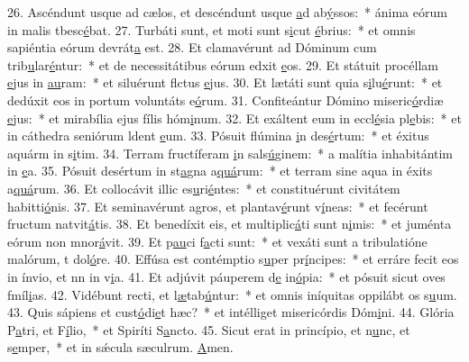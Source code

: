 26. Ascéndunt usque ad cælos, et descéndunt usque \uline{a}d ab\uline{ý}ssos:~* ánima eórum in malis tbesc\uline{é}bat.
27. Turbáti sunt, et moti sunt s\uline{i}cut \uline{é}brius:~* et omnis sapiéntia eórum devrát\uline{a} est.
28. Et clamavérunt ad Dóminum cum trib\uline{u}lar\uline{é}ntur:~* et de necessitátibus eórum edxit \uline{e}os.
29. Et státuit procéllam \uline{e}jus in \uline{au}ram:~* et siluérunt flctus \uline{e}jus.
30. Et lætáti sunt quia s\uline{i}lu\uline{é}runt:~* et dedúxit eos in portum voluntáts e\uline{ó}rum.
31. Confiteántur Dómino miseric\uline{ó}rdiæ \uline{e}jus:~* et mirabília ejus fílis hóm\uline{i}num.
32. Et exáltent eum in eccl\uline{é}sia pl\uline{e}bis:~* et in cáthedra seniórum ldent \uline{e}um.
33. Pósuit flúmina \uline{i}n des\uline{é}rtum:~* et éxitus aquárm in s\uline{i}tim.
34. Terram fructíferam \uline{i}n sals\uline{ú}ginem:~* a malítia inhabitántim in \uline{e}a.
35. Pósuit desértum in st\uline{a}gna a\uline{quá}rum:~* et terram sine aqua in éxits a\uline{quá}rum.
36. Et collocávit illic es\uline{u}ri\uline{é}ntes:~* et constituérunt civitátem habitti\uline{ó}nis.
37. Et seminavérunt agros, et plantav\uline{é}runt v\uline{í}neas:~* et fecérunt fructum natvit\uline{á}tis.
38. Et benedíxit eis, et multiplic\uline{á}ti sunt n\uline{i}mis:~* et juménta eórum non mnor\uline{á}vit.
39. Et p\uline{au}ci f\uline{a}cti sunt:~* et vexáti sunt a tribulatióne malórum, t dol\uline{ó}re.
40. Effúsa est contémptio s\uline{u}per pr\uline{í}ncipes:~* et erráre fecit eos in ínvio, et nn in v\uline{i}a.
41. Et adjúvit páuperem d\uline{e} in\uline{ó}pia:~* et pósuit sicut oves fmíl\uline{i}as.
42. Vidébunt recti, et l\uline{æ}tab\uline{ú}ntur:~* et omnis iníquitas oppilábt os s\uline{u}um.
43. Quis sápiens et cust\uline{ó}di\uline{e}t hæc?~* et intélliget misericórdis Dóm\uline{i}ni.
44. Glória P\uline{a}tri, et F\uline{í}lio,~* et Spiríti S\uline{a}ncto.
45. Sicut erat in princípio, et n\uline{u}nc, et s\uline{e}mper,~* et in sǽcula sæculrum. \uline{A}men.
